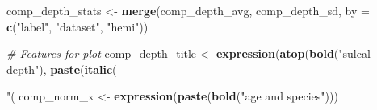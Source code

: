 \documentclass[
]{article}
\newenvironment{Shaded}{\begin{snugshade}}{\end{snugshade}}
\newcommand{\CommentTok}[1]{\textcolor[rgb]{0.56,0.35,0.01}{\textit{#1}}}
\newcommand{\DataTypeTok}[1]{\textcolor[rgb]{0.13,0.29,0.53}{#1}}
\newcommand{\KeywordTok}[1]{\textcolor[rgb]{0.13,0.29,0.53}{\textbf{#1}}}
\newcommand{\NormalTok}[1]{#1}
\newcommand{\StringTok}[1]{\textcolor[rgb]{0.31,0.60,0.02}{#1}}
\begin{document}
\begin{Shaded}
\begin{Highlighting}[]
\NormalTok{comp_depth_stats <-}\StringTok{ }\KeywordTok{merge}\NormalTok{(comp_depth_avg, comp_depth_sd, }\DataTypeTok{by =} \KeywordTok{c}\NormalTok{(}\StringTok{"label"}\NormalTok{, }\StringTok{"dataset"}\NormalTok{, }\StringTok{"hemi"}\NormalTok{))}

\CommentTok{# Features for plot}
\NormalTok{comp_depth_title <-}\StringTok{ }\KeywordTok{expression}\NormalTok{(}\KeywordTok{atop}\NormalTok{(}\KeywordTok{bold}\NormalTok{(}\StringTok{"sulcal depth"}\NormalTok{), }\KeywordTok{paste}\NormalTok{(}\KeywordTok{italic}\NormalTok{(}\StringTok{"(% of max depth)"}\NormalTok{))))}
\NormalTok{comp_norm_x <-}\StringTok{ }\KeywordTok{expression}\NormalTok{(}\KeywordTok{paste}\NormalTok{(}\KeywordTok{bold}\NormalTok{(}\StringTok{"age and species"}\NormalTok{)))}

}
\end{Highlighting}
\end{Shaded}
\end{document}
